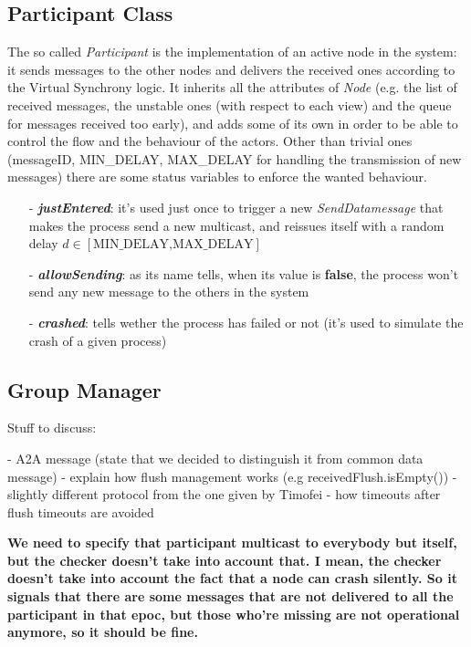 \documentclass[11pt]{article}
\begin{document}
	\subsection{Participant Class}
		The so called \textit{Participant} is the implementation of an active node in the system: it sends messages to the other nodes and delivers the received ones according to the Virtual Synchrony logic.\newline
		It inherits all the attributes of \textit{Node} (e.g. the list of received messages, the unstable ones (with respect to each view) and the queue for messages received too early), and adds some of its own in order to be able to control the flow and the behaviour of the actors. Other than trivial ones (messageID, MIN\_DELAY, MAX\_DELAY for handling the transmission of new messages) there are some status variables to enforce the wanted behaviour. 
		\begin{itemize}
			\item [-] \textit{\textbf{justEntered}}: it's used just once to trigger a new \textit{SendDatamessage} that makes the process send a new multicast, and reissues itself with a random delay $d \in [\text{MIN\_DELAY,MAX\_DELAY}]$
			\item [-] \textit{\textbf{allowSending}}: as its name tells, when its value is \textbf{false}, the process won't send any new message to the others in the system
			\item [-] \textit{\textbf{crashed}}: tells wether the process has failed or not (it's used to simulate the crash of a given process)
		\end{itemize}
		
	\subsection{Group Manager}
		
	Stuff to discuss:
	
	- A2A message (state that we decided to distinguish it from common data message)
	- explain how flush management works (e.g receivedFlush.isEmpty())
	- slightly different protocol from the one given by Timofei
	- how timeouts after flush timeouts are avoided
	
	\textbf{We need to specify that participant multicast to everybody but itself, but the checker doesn't take into account that. I mean, the checker doesn't take into account the fact that a node can crash silently. So it signals that there are some messages that are not delivered to all the participant in that epoc, but those who're missing are not operational anymore, so it should be fine.}
	
\end{document}
